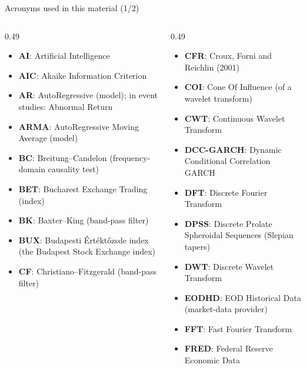 {
\begin{frame}[noframenumbering]
    \titlepage
\end{frame}
}
\begin{frame}{Acronyms used in this material (1/2)}
\begin{columns}[T]
\begin{column}{0.49\textwidth}
\begin{itemize}\setlength{\itemsep}{0pt}
    \item \textbf{AI}: Artificial Intelligence
    \item \textbf{AIC}: Akaike Information Criterion
    \item \textbf{AR}: AutoRegressive (model); in event studies: Abnormal Return
    \item \textbf{ARMA}: AutoRegressive Moving Average (model)
    \item \textbf{BC}: Breitung–Candelon (frequency-domain causality test)
    \item \textbf{BET}: Bucharest Exchange Trading (index)
    \item \textbf{BK}: Baxter–King (band-pass filter)
    \item \textbf{BUX}: Budapesti Értéktőzsde index (the Budapest Stock Exchange index)
    \item \textbf{CF}: Christiano–Fitzgerald (band-pass filter)
\end{itemize}
\end{column}
\begin{column}{0.49\textwidth}
\begin{itemize}\setlength{\itemsep}{0pt}
    \item \textbf{CFR}: Croux, Forni and Reichlin (2001)
    \item \textbf{COI}: Cone Of Influence (of a wavelet transform)
    \item \textbf{CWT}: Continuous Wavelet Transform
    \item \textbf{DCC-GARCH}: Dynamic Conditional Correlation GARCH
    \item \textbf{DFT}: Discrete Fourier Transform
    \item \textbf{DPSS}: Discrete Prolate Spheroidal Sequences (Slepian tapers)
    \item \textbf{DWT}: Discrete Wavelet Transform
    \item \textbf{EODHD}: EOD Historical Data (market-data provider)
    \item \textbf{FFT}: Fast Fourier Transform
    \item \textbf{FRED}: Federal Reserve Economic Data
\end{itemize}
\end{column}
\end{columns}
\end{frame}
